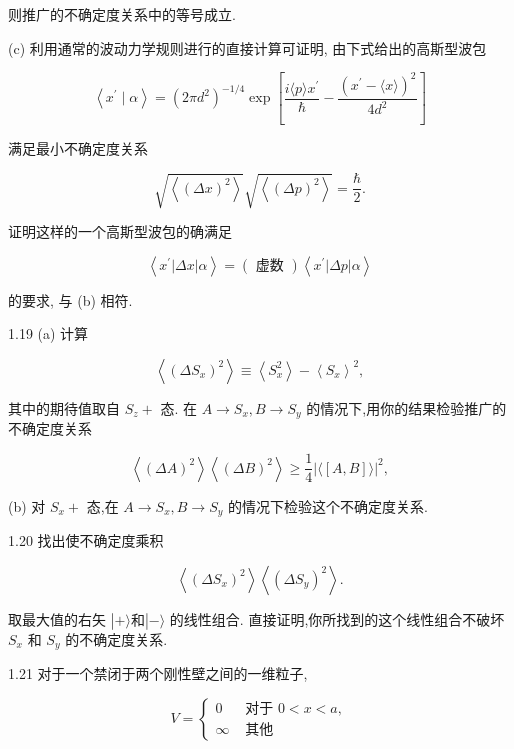 \documentclass[lang=cn,newtx,10pt,scheme=chinese,thmcnt=section]{elegantbook}
\begin{document}
则推广的不确定度关系中的等号成立.

(c) 利用通常的波动力学规则进行的直接计算可证明, 由下式给出的高斯型波包

$$
\left\langle {{x}^{\prime } \mid \alpha }\right\rangle = {\left( 2\pi {d}^{2}\right) }^{-1/4}\exp \left\lbrack {\frac{i\langle p\rangle {x}^{\prime }}{\hbar } - \frac{{\left( {x}^{\prime }-\langle x\rangle \right) }^{2}}{4{d}^{2}}}\right\rbrack
$$

满足最小不确定度关系

$$
\sqrt{\left\langle {\left( \Delta x\right) }^{2}\right\rangle }\sqrt{\left\langle {\left( \Delta p\right) }^{2}\right\rangle } = \frac{\hbar }{2}.
$$

证明这样的一个高斯型波包的确满足

$$
\left\langle {{x}^{\prime }\left| {\Delta x}\right| \alpha }\right\rangle = \left( \text{ 虚数 }\right) \left\langle {{x}^{\prime }\left| {\Delta p}\right| \alpha }\right\rangle
$$

的要求, 与 (b) 相符.

1.19 (a) 计算

$$
\left\langle {\left( \Delta {S}_{x}\right) }^{2}\right\rangle \equiv \left\langle {S}_{x}^{2}\right\rangle - {\left\langle {S}_{x}\right\rangle }^{2},
$$

其中的期待值取自 ${S}_{z} +$ 态. 在 $A \rightarrow {S}_{x}, B \rightarrow {S}_{y}$ 的情况下,用你的结果检验推广的不确定度关系

$$
\left\langle {\left( \Delta A\right) }^{2}\right\rangle \left\langle {\left( \Delta B\right) }^{2}\right\rangle \geq \frac{1}{4}{\left| \langle \left\lbrack A, B\right\rbrack \rangle \right| }^{2},
$$

(b) 对 ${S}_{x} +$ 态,在 $A \rightarrow {S}_{x}, B \rightarrow {S}_{y}$ 的情况下检验这个不确定度关系.

1.20 找出使不确定度乘积

$$
\left\langle {\left( \Delta {S}_{x}\right) }^{2}\right\rangle \left\langle {\left( \Delta {S}_{y}\right) }^{2}\right\rangle .
$$

取最大值的右矢 $\left| {+\rangle \text{和}}\right| - \rangle$ 的线性组合. 直接证明,你所找到的这个线性组合不破坏 ${S}_{x}$ 和 ${S}_{y}$ 的不确定度关系.

1.21 对于一个禁闭于两个刚性壁之间的一维粒子,

$$
V = \left\{ \begin{array}{ll} 0 & \text{ 对于 }0 < x < a, \\ \infty & \text{ 其他 } \end{array}\right.
$$
\end{document}
